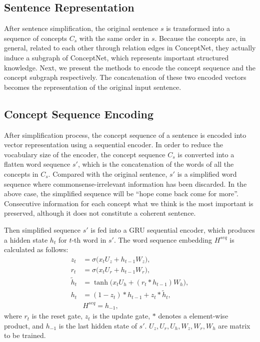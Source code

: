 \subsection{Sentence Representation}
\label{sec:represent}
After sentence simplification, the original sentence $s$ is transformed into
a sequence of concepts $C_s$ with the same order in $s$. Because the 
concepts are, in general, related to each other through relation edges in
ConceptNet, they actually induce a subgraph of ConceptNet, which represents
important structured knowledge. Next, we present the methods to
encode the concept sequence and the concept subgraph respectively.
The concatenation of these two encoded vectors becomes the 
representation of the original input sentence.  

\subsection*{Concept Sequence Encoding}

After simplification process, the concept sequence of a sentence
is encoded into vector representation using a sequential encoder.
In order to reduce the vocabulary size of the encoder,
the concept sequence $C_s$ is converted into a flatten word sequence $s'$,
which is the concatenation of the words of all the concepts in $C_s$.
Compared with the original sentence, $s'$ is a simplified word sequence
where commonsense-irrelevant information has been discarded. 
In the above case, the simplified sequence will be 
``hope come back come for more''. 
Consecutive information for each concept what we 
think is the most important is preserved, 
although it does not constitute a coherent sentence.

Then simplified sequence $s'$ is fed into a GRU sequential encoder,
which produces a hidden state $h_t$ for $t$-th word in $s'$.
The word sequence embedding $H^{seq}$ is calculated
as follows:
\begin{equation}
\begin{aligned}
  z_{t} & =\sigma\big(x_{t}U_{z}+h_{t-1}W_{z}\big), \\
  r_{t} & =\sigma\big(x_{t}U_{r}+h_{t-1}W_{r}\big), \\
  \tilde{h}_{t} & =\tanh\big(x_{t}U_{h}+(r_{t}\ast h_{t-1})W_{h}\big), \\
  h_{t} & =(1-z_{t})\ast h_{t-1}+z_{t}\ast\tilde{h}_{t}, \\
        & H^{seq} = h_{-1},
\end{aligned}
\end{equation}
\noindent
where $r_{t} $ is the reset gate,
$z_{t}$ is the update gate,
$\ast$ denotes a element-wise product,
and $h_{-1}$ is the last hidden state of $s'$.
$U_{z},U_{r},U_{h},W_{z}, W_{r}, W_{h}$ are matrix to be trained.

